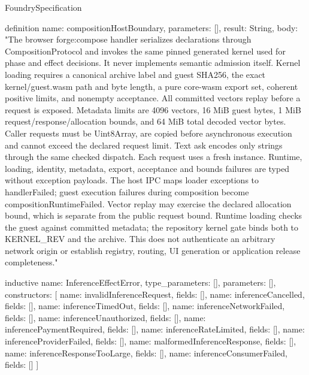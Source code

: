 \begin{lexlean}{FoundrySpecification}
\begin{semanticmodule}
definition{
  name: compositionHostBoundary,
  parameters: [],
  result: String,
  body: "The browser forge:compose handler serializes declarations through CompositionProtocol and invokes the same pinned generated kernel used for phase and effect decisions. It never implements semantic admission itself. Kernel loading requires a canonical archive label and guest SHA256, the exact kernel/guest.wasm path and byte length, a pure core-wasm export set, coherent positive limits, and nonempty acceptance. All committed vectors replay before a request is exposed. Metadata limits are 4096 vectors, 16 MiB guest bytes, 1 MiB request/response/allocation bounds, and 64 MiB total decoded vector bytes. Caller requests must be Uint8Array, are copied before asynchronous execution and cannot exceed the declared request limit. Text ask encodes only strings through the same checked dispatch. Each request uses a fresh instance. Runtime, loading, identity, metadata, export, acceptance and bounds failures are typed without exception payloads. The host IPC maps loader exceptions to handlerFailed; guest execution failures during composition become compositionRuntimeFailed. Vector replay may exercise the declared allocation bound, which is separate from the public request bound. Runtime loading checks the guest against committed metadata; the repository kernel gate binds both to KERNEL_REV and the archive. This does not authenticate an arbitrary network origin or establish registry, routing, UI generation or application release completeness."
}

inductive{
  name: InferenceEffectError,
  type_parameters: [],
  parameters: [],
  constructors: [
    {name: invalidInferenceRequest, fields: []},
    {name: inferenceCancelled, fields: []},
    {name: inferenceTimedOut, fields: []},
    {name: inferenceNetworkFailed, fields: []},
    {name: inferenceUnauthorized, fields: []},
    {name: inferencePaymentRequired, fields: []},
    {name: inferenceRateLimited, fields: []},
    {name: inferenceProviderFailed, fields: []},
    {name: malformedInferenceResponse, fields: []},
    {name: inferenceResponseTooLarge, fields: []},
    {name: inferenceConsumerFailed, fields: []}
  ]
}


\end{semanticmodule}
\end{lexlean}
